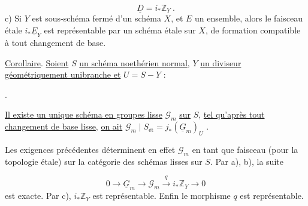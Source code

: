 \begin{equation*}
\underline{D} = i_* \mathbb{Z}_Y \ .
\end{equation*}
c) Si $Y$ est sous-schéma fermé d'un schéma $X$, et $E$ un ensemble, alors le faisceau étale $i_* \underline{E}_Y$ est représentable par un schéma étale sur $X$, de formation compatible à tout changement de base.

\underline{Corollaire}. \underline{Soient} $S$ \underline{un schéma noethérien normal}, $Y$ \underline{un diviseur géométriquement unibranche et} $U = S-Y$ :

\begin{center}
\quad .
\end{center}
\underline{Il existe un unique schéma en groupes lisse} $\mathcal{G}_m$ \underline{sur} $S$, \underline{tel qu'après tout changement de base lisse}, \underline{on ait} $\mathcal{G}_m \mid S_{\text{\'et}} = j_*(\underline{G}_m)_U$ .

Les exigences précédentes déterminent en effet $\mathcal{G}_m$ en tant que faisceau (pour la topologie étale) sur la catégorie des schémas lisses sur $S$. Par a), b), la suite

\begin{equation*}
0 \longrightarrow \underline{G}_m \longrightarrow \mathcal{G}_m \xrightarrow{\ q\ } i_* \mathbb{Z}_Y \longrightarrow 0
\end{equation*}
est exacte. Par c), $i_* \mathbb{Z}_Y$ est représentable. Enfin le morphisme $q$ est représentable.

